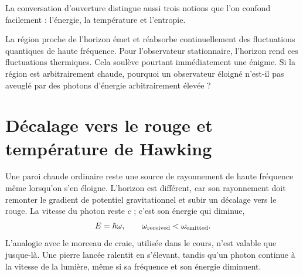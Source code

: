 La conversation d’ouverture distingue aussi trois notions que l’on confond facilement : l’énergie, la température et l’entropie.

\begin{classroomqa}
\end{classroomqa}


La région proche de l’horizon émet et réabsorbe continuellement des fluctuations quantiques de haute fréquence. Pour l’observateur stationnaire, l’horizon rend ces fluctuations thermiques. Cela soulève pourtant immédiatement une énigme. Si la région est arbitrairement chaude, pourquoi un observateur éloigné n’est-il pas aveuglé par des photons d’énergie arbitrairement élevée ?

\section{Décalage vers le rouge et température de Hawking}

Une paroi chaude ordinaire reste une source de rayonnement de haute fréquence même lorsqu’on s’en éloigne. L’horizon est différent, car son rayonnement doit remonter le gradient de potentiel gravitationnel et subir un décalage vers le rouge. La vitesse du photon reste \(c\) ; c’est son énergie qui diminue,
\begin{equation}
E=\hbar\omega,
\qquad
\omega_{\rm received}<\omega_{\rm emitted}.
\end{equation}
L’analogie avec le morceau de craie, utilisée dans le cours, n’est valable que jusque-là. Une pierre lancée ralentit en s’élevant, tandis qu’un photon continue à la vitesse de la lumière, même si sa fréquence et son énergie diminuent.


